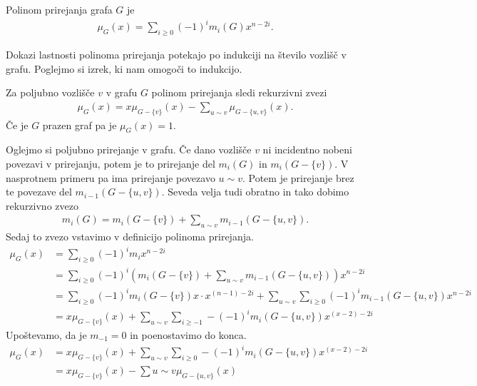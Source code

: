 \begin{definicija}
    Polinom prirejanja grafa \(G\) je
    \begin{align*}
        \mu_G(x) = \sum_{i\geq 0} (-1)^i m_i(G) x^{n-2i}.
    \end{align*}
\end{definicija}

Dokazi lastnosti polinoma prirejanja potekajo po indukciji na število vozlišč v grafu. Poglejmo si izrek, ki nam omogoči to indukcijo.
\begin{izrek}
    Za poljubno vozlišče \(v\) v grafu \(G\) polinom prirejanja sledi rekurzivni zvezi
    \begin{align*}
        \mu_G(x) = x \mu_{G-\{v\}}(x) - \sum_{u\sim v} \mu_{G-\{u, v\}}(x).
    \end{align*}
    Če je \(G\) prazen graf pa je \(\mu_G(x) = 1\).
\end{izrek}
\begin{dokaz}
    Oglejmo si poljubno prirejanje v grafu. Če dano vozlišče \(v\) ni incidentno nobeni povezavi v prirejanju, potem je to prirejanje del \(m_i(G)\) in \(m_i({G-\{v\}})\). V nasprotnem primeru pa ima prirejanje povezavo \(u\sim v\). Potem je prirejanje brez te povezave del \(m_{i-1}({G-\{u, v\}})\). Seveda velja tudi obratno in tako dobimo rekurzivno zvezo
    \begin{align*}
        m_i(G) = m_i({G-\{v\}}) + \sum_{u\sim v} m_{i-1}({G-\{u, v\}}).
    \end{align*}
    Sedaj to zvezo vstavimo v definicijo polinoma prirejanja.
    \begin{align*}
        \mu_G(x) & = \sum_{i\geq 0} (-1)^i m_i x^{n-2i}                                                                                             \\
                 & = \sum_{i\geq 0} (-1)^i \left( m_i({G-\{v\}}) + \sum_{u\sim v} m_{i-1}({G-\{u, v\}}) \right) x^{n-2i}                            \\
                 & = \sum_{i\geq 0} (-1)^i m_i({G-\{v\}}) x\cdot x^{(n-1)-2i} + \sum_{u\sim v} \sum_{i\geq 0} (-1)^i m_{i-1}({G-\{u, v\}}) x^{n-2i} \\
                 & = x \mu_{G-\{v\}}(x) + \sum_{u\sim v} \sum_{i \geq -1} -(-1)^i m_{i}(G-\{u, v\}) x^{(x-2)-2i}
    \end{align*}
    Upoštevamo, da je \(m_{-1} = 0\) in poenostavimo do konca.
    \begin{align*}
        \mu_G(x) & = x \mu_{G-\{v\}}(x) + \sum_{u\sim v} \sum_{i \geq 0} -(-1)^i m_{i}(G-\{u, v\}) x^{(x-2)-2i} \\
                 & = x \mu_{G-\{v\}}(x) - \sum{u\sim v} \mu_{G-\{u, v\}}(x)
    \end{align*}
\end{dokaz}

